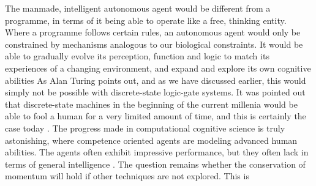 The manmade, intelligent autonomous agent would be different from a programme, in terms of it being able to operate like a free, thinking entity.
Where a programme follows certain rules, an autonomous agent would only be constrained by mechanisms analogous to our biological constraints.
It would be able to gradually evolve its perception, function and logic to match its experiences of a changing environment, and expand and explore its own cognitive abilities \cite{franklin_graesser_agents}
As Alan Turing points out, and as we have discussed earlier, this would simply not be possible with discrete-state logic-gate systems.
It was pointed out that discrete-state machines in the beginning of the current millenia would be able to fool a human for a very limited amount of time,
and this is certainly the case today \cite{computing_machine_intelligence_turing}. The progress made in computational cognitive science is truly astonishing, where competence oriented agents are modeling advanced human abilities. The agents often exhibit impressive performance, but they often lack in terms of general intelligence \cite{wilson_animat}. The question remains whether the conservation of momentum will hold if other techniques are not explored. This is

